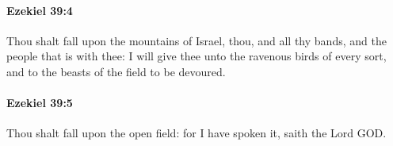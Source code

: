 		\paragraph{Ezekiel 39:4} %
			\label{EZEKIEL-39-4}

			Thou shalt fall upon the mountains of Israel, thou, and all thy bands, and the people that is with thee: I will give thee unto the ravenous birds of every sort, and to the beasts of the field to be devoured.


		\paragraph{Ezekiel 39:5} %
			\label{EZEKIEL-39-5}

			Thou shalt fall upon the open field: for I have spoken it, saith the Lord GOD.


